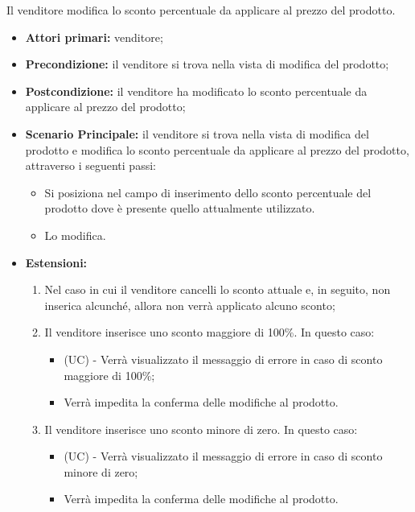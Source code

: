 Il venditore modifica lo sconto percentuale da applicare al prezzo del prodotto.
\begin{itemize}
    \item \textbf{Attori primari:} venditore;
    \item \textbf{Precondizione:} il venditore si trova nella vista di modifica del prodotto;
    \item \textbf{Postcondizione:} il venditore ha modificato lo sconto percentuale da applicare al prezzo del prodotto;
    \item \textbf{Scenario Principale:} il venditore si trova nella vista di modifica del prodotto e modifica lo sconto percentuale da applicare al prezzo del prodotto, attraverso i seguenti passi:
    \begin{itemize}
        \item Si posiziona nel campo di inserimento dello sconto percentuale del prodotto dove è presente quello attualmente utilizzato.
        \item Lo modifica.
    \end{itemize}
    \item \textbf{Estensioni:}
    \begin{enumerate}
    	\item Nel caso in cui il venditore cancelli lo sconto attuale e, in seguito, non inserica alcunché, allora non verrà applicato alcuno sconto;
    	\item Il venditore inserisce uno sconto maggiore di 100\%. In questo caso:
    	\begin{itemize}
    		\item (UC) - Verrà visualizzato il messaggio di errore in caso di sconto maggiore di 100\%;
    		\item Verrà impedita la conferma delle modifiche al prodotto.
    	\end{itemize}
    	\item Il venditore inserisce uno sconto minore di zero. In questo caso:
    	\begin{itemize}
    		\item (UC) - Verrà visualizzato il messaggio di errore in caso di sconto minore di zero;
    		\item Verrà impedita la conferma delle modifiche al prodotto.
    	\end{itemize}
    \end{enumerate}
\end{itemize}

